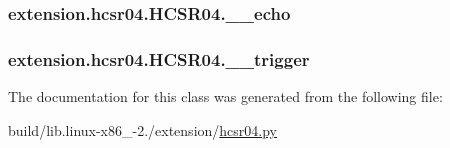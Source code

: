 \subsubsection[{\+\_\+\+\_\+echo}]{\setlength{\rightskip}{0pt plus 5cm}extension.\+hcsr04.\+H\+C\+S\+R04.\+\_\+\+\_\+echo\hspace{0.3cm}{\ttfamily [private]}}\label{classextension_1_1hcsr04_1_1HCSR04_a3f98f7d8fbe4b6ded144157805d9f4c0}
\hypertarget{classextension_1_1hcsr04_1_1HCSR04_a6bbac2dbe57cd5c8d684bb4660a30326}{}
\subsubsection[{\+\_\+\+\_\+trigger}]{\setlength{\rightskip}{0pt plus 5cm}extension.\+hcsr04.\+H\+C\+S\+R04.\+\_\+\+\_\+trigger\hspace{0.3cm}{\ttfamily [private]}}\label{classextension_1_1hcsr04_1_1HCSR04_a6bbac2dbe57cd5c8d684bb4660a30326}


The documentation for this class was generated from the following file\+:\begin{DoxyCompactItemize}
\item 
build/lib.\+linux-\/x86\+\_-\/2./extension/\hyperlink{build_2lib_8linux-x86__64-2_87_2extension_2hcsr04_8py}{hcsr04.\+py}\end{DoxyCompactItemize}
